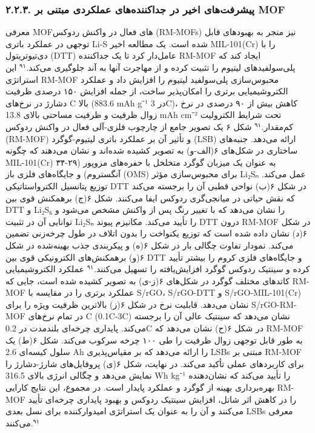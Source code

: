 \documentclass[12pt,a4paper,twocolumn]{article} %
\newcommand{\persian}[1]{\textfarsi{#1}}
\newcommand{\english}[1]{\textenglish{#1}}
\begin{document}
\subsubsection*{\persian{۲.۲.۳. پیشرفت‌های اخیر در جداکننده‌های عملکردی مبتنی بر \english{MOF}}}
\persian{
معرفی \english{MOF}های فعال در واکنش ردوکس (\english{RM-MOFs}) نیز منجر به بهبودهای قابل توجهی در عملکرد باتری \english{Li-S} شده است. یک مطالعه اخیر \english{MIL-101(Cr)} را با دی‌تیوتریتول (\english{DTT}) عامل‌دار کرد تا یک جداکننده \english{RM-MOF} ایجاد کند که پلی‌سولفیدهای لیتیوم را تثبیت کرده و از مهاجرت آنها به آند جلوگیری می‌کند.$^{۹۱}$ این استراتژی \english{RM-MOF} محبوس‌سازی پلی‌سولفید لیتیوم را افزایش داد و عملکرد الکتروشیمیایی برتری را امکان‌پذیر ساخت، از جمله افزایش ۱۵۰ درصدی ظرفیت دشارژ در نرخ‌های \english{C} بالا (\english{883.6 mAh g⁻¹} در \english{3C})، کاهش بیش از ۹۰ درصدی در نرخ زوال ظرفیت و ظرفیت مساحتی بالای \english{13.8 mAh cm⁻²} تحت شرایط الکترولیت کم‌مقدار.$^{۹۱}$ شکل ۶ یک تصویر جامع از چارچوب فلزی-آلی فعال در واکنش ردوکس (\english{RM-MOF}) و تأثیر آن بر عملکرد باتری لیتیوم-گوگرد (\english{LSB}) ارائه می‌دهد. جنبه‌های ساختاری در شکل‌های ۶(الف-و) به تصویر کشیده شده‌اند و نشان می‌دهند که چگونه \english{MIL-101(Cr)} به عنوان یک میزبان گوگرد متخلخل با حفره‌های مزوپور (۲۹-۳۴ آنگستروم) و جایگاه‌های فلزی باز (\english{OMS}) برای محبوس‌سازی مؤثر \english{Li₂Sₙ} عمل می‌کند. توزیع پتانسیل الکترواستاتیکی \english{DTT} در شکل ۶(ب) نواحی قطبی آن را برجسته می‌کند که نقش حیاتی در میانجی‌گری ردوکس ایفا می‌کنند. شکل ۶(ج) برهمکنش قوی بین \english{DTT} و \english{Li₂S₆} را نشان می‌دهد که با تغییر رنگ پس از واکنش مشخص می‌شود و توانایی آن در تثبیت \english{Li₂Sₙ} را تأیید می‌کند. مکانیزم پیوند \english{DTT} درون \english{RM-MOF} در شکل ۶(د) نشان داده شده است که توزیع یکنواخت را بدون اتلاف در طول چرخه‌زنی تضمین می‌کند. نمودار تفاوت چگالی بار در شکل ۶(ه) و پیکربندی جذب بهینه‌شده در شکل ۶(و) برهمکنش‌های الکترونیکی قوی بین \english{DTT} و جایگاه‌های فلزی کروم را بیشتر تأیید کرده و سینتیک ردوکس گوگرد افزایش‌یافته را تسهیل می‌کنند.$^{۹۱}$
}
\persian{
عملکرد الکتروشیمیایی کاتدهای مختلف گوگرد در شکل‌های ۶(ز-ی) به تصویر کشیده شده است، جایی که \english{RM-MOF} عملکرد برتری را در مقایسه با \english{S/rGO}، \english{S/rGO-DTT} و \english{S/rGO-MIL-101(Cr)} نشان می‌دهد. قابلیت نرخ در شکل ۶(ز) بالاترین ظرفیت ویژه را برای \english{S/rGO-RM-MOF} در تمام نرخ‌های \english{C} (\english{0.1C-3C}) نشان می‌دهد که سینتیک عالی آن را برجسته می‌کند. پایداری چرخه‌ای بلندمدت در \english{0.2C} در شکل ۶(ح) نشان می‌دهد که \english{RM-MOF} به طور قابل توجهی زوال ظرفیت را طی ۱۰۰ چرخه سرکوب می‌کند. شکل ۶(ط) یک سلول کیسه‌ای \english{2.6 Ah} را ارائه می‌دهد که بر مقیاس‌پذیری \english{LSBs} مبتنی بر \english{RM-MOF} برای کاربردهای عملی تأکید می‌کند. در نهایت، شکل ۶(ی) پروفایل‌های شارژ-دشارژ را نمایش می‌دهد و چگالی انرژی بالای \english{316.5 Wh kg⁻¹} را تأیید می‌کند که نشان‌دهنده بهره‌برداری بهینه از گوگرد و عملکرد پایدار است. در مجموع، این نتایج کارایی \english{RM-MOF} را در کاهش اثر شاتل، افزایش سینتیک ردوکس و بهبود پایداری چرخه‌ای تأیید می‌کنند و آن را به عنوان یک استراتژی امیدوارکننده برای نسل بعدی \english{LSBs} معرفی می‌کنند.$^{۹۱}$
}
\end{document}
